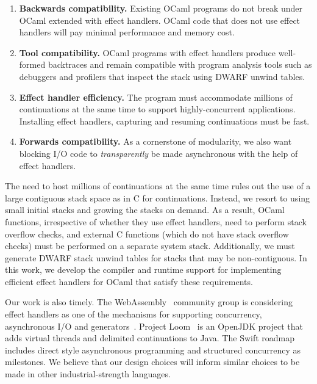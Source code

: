 \documentclass[sigplan,screen]{acmart}
\begin{document}
\begin{enumerate}[label=R\arabic*]
	\item \textbf{Backwards compatibility.} Existing OCaml programs do not break
		under OCaml extended with effect handlers. OCaml code that does not use
		effect handlers will pay minimal performance and memory cost.

	\item \textbf{Tool compatibility.} OCaml programs with effect handlers
		produce well-formed backtraces and remain compatible with program analysis
		tools such as debuggers and profilers that inspect the stack using DWARF
		unwind tables.

	\item \textbf{Effect handler efficiency.} The program must accommodate
		millions of continuations at the same time to support highly-concurrent
		applications. Installing effect handlers, capturing and resuming
		continuations must be fast.

	\item \textbf{Forwards compatibility.} As a cornerstone of modularity, we
		also want blocking I/O code to \emph{transparently} be made asynchronous
		with the help of effect handlers.
\end{enumerate}

The need to host millions of continuations at the same time rules out the use
of a large contiguous stack space as in C for continuations. Instead, we resort
to using small initial stacks and growing the stacks on demand. As a result,
OCaml functions, irrespective of whether they use effect handlers, need to
perform stack overflow checks, and external C functions (which do not have stack
overflow checks) must be performed on a separate system stack. Additionally, we
must generate DWARF stack unwind tables for stacks that may be non-contiguous.
In this work, we develop the compiler and runtime support for implementing
efficient effect handlers for OCaml that satisfy these requirements.

Our work is also timely. The WebAssembly~\cite{Hass17} community group is
considering effect handlers as one of the mechanisms for supporting
concurrency, asynchronous I/O and generators~\cite{WasmProposal}. Project
Loom~\cite{loom} is an OpenJDK project that adds virtual threads and delimited
continuations to Java. The Swift roadmap~\cite{swift} includes direct style
asynchronous programming and structured concurrency as milestones. We believe
that our design choices will inform similar choices to be made in other
industrial-strength languages.
\end{document}
